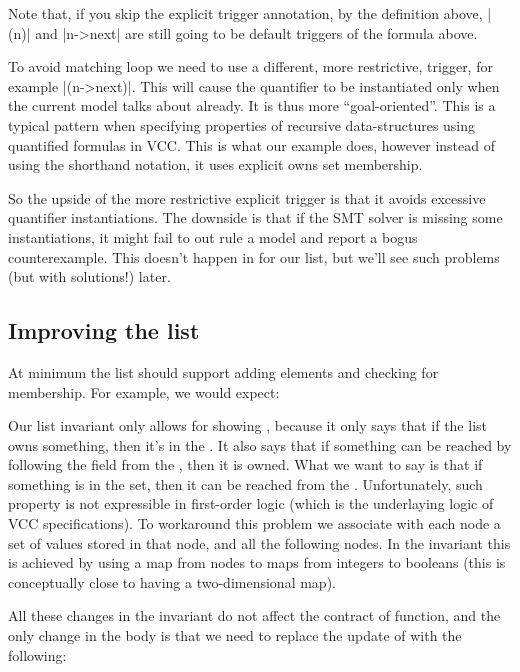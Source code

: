 Note that, if you skip the explicit trigger annotation, by the definition
above, \vcc|{\mine(n)}| and \vcc|n->next| are still going to be default
triggers of the formula above.

To avoid matching loop we need to use a different, more restrictive,
trigger, for example \vcc|{\mine(n->next)}|.
This will cause the quantifier to be instantiated only when the current
model talks about  already.
It is thus more ``goal-oriented''.
This is a typical pattern when specifying properties of recursive data-structures
using quantified formulas in VCC.
This is what our example does, however instead of using the shorthand
notation, it uses explicit owns set membership.

So the upside of the more restrictive explicit trigger is that it avoids
excessive quantifier instantiations.
The downside is that if the SMT solver is missing some instantiations,
it might fail to out rule a model and report a bogus counterexample.
This doesn't happen in for our list, but we'll see such problems
(but with solutions!) later.

\subsection{Improving the list}

At minimum the list should support adding elements and checking
for membership. For example, we would expect:


\noindent
Our list invariant only allows for showing
, because it only says
that if the list owns something, then it's in the .
It also says that if something can be reached by following
the  field from the , then it is owned.
What we want to say is that if something is in the 
set, then it can be reached from the .
Unfortunately, such property is not expressible in first-order
logic (which is the underlaying logic of VCC specifications).
To workaround this problem we associate with each node
a set of values stored in that node, and all the following nodes.
In the invariant this is achieved by using a map from nodes
to maps from integers to booleans (this is conceptually close
to having a two-dimensional map).


\noindent
{}
All these changes in the invariant do not affect
the contract of  function, and the only change in the body
is that we need to replace the update of  with the following:

